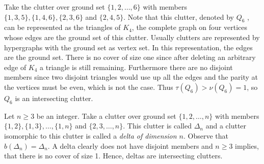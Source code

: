\documentclass[a4paper, 12pt]{scrbook}
\theoremstyle{definition}
\begin{document}
Take the clutter over ground set $\{1,2,\ldots,6\}$ with members $\{1,3,5\}, \{1,4,6\}, \{2,3,6\}$ and $\{2,4,5\}$.
Note that this clutter, denoted by $Q_6$ \cite{q6}, can be represented as the triangles of $K_4$, the complete graph on four vertices whose edges are the ground set of this clutter. Usually clutters are represented by hypergraphs with the ground set as vertex set. In this representation, the edges are the ground set.
There is no cover of size one since after deleting an arbitrary edge of $K_4$ a triangle is still remaining.
Furthermore there are no disjoint members since two disjoint triangles would use up all the edges and the parity at the vertices must be even, which is not the case.
Thus $\tau(Q_6) > \nu(Q_6) = 1$, so $Q_6$ is an intersecting clutter.

    \begin{figure}
        \centering
        \begin{minipage}{.4\textwidth}
            \centering
        \end{minipage}
        \begin{minipage}{.4\textwidth}
            \centering
        \end{minipage}
    \end{figure}


Let $n \geq 3$ be an integer.
Take a clutter over ground set $\{1,2,\ldots,n\}$ with members $\{1,2\},\{1,3\},\ldots,\{1,n\}$ and $\{2,3,\ldots,n\}$.
This clutter is called $\Delta_n$ and a clutter isomorphic to this clutter is called a \emph{delta of dimension $n$}\cite{deltadefinition}.
Observe that $b(\Delta_n)=\Delta_n$.
A delta clearly does not have disjoint members and $n\geq 3$ implies, that there is no cover of size 1.
Hence, deltas are intersecting clutters.
\end{document}
